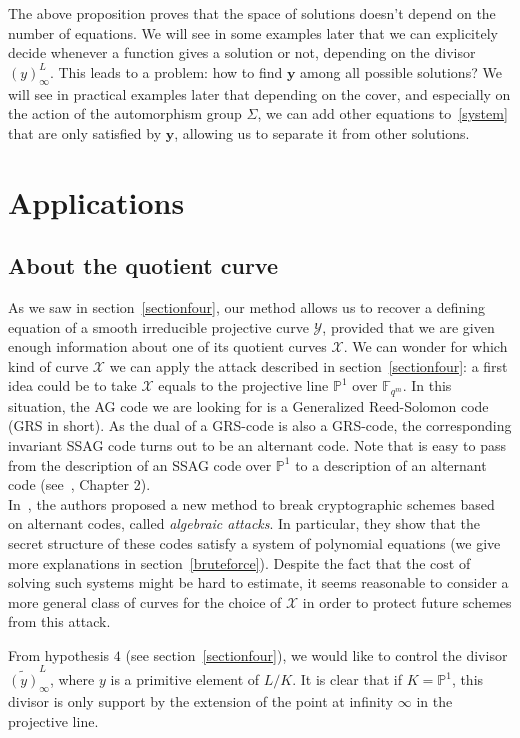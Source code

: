 \documentclass[10pt]{article}
\theoremstyle{definition}
\theoremstyle{definition}
\theoremstyle{definition}
\newcommand{\PP}{\mathbb{P}}
\newcommand{\fqm}{\mathbb{F}_{q^m}}
\newcommand{\X}{\mathcal{X}}
\newcommand{\Y}{\mathcal{Y}}
\begin{document}
The above proposition proves that the space of solutions doesn't depend on the number of equations. 
We will see in some examples later that we can explicitely decide whenever a function gives a solution or not, depending on the divisor $(y)^L_{\infty}$. This leads to a problem: how to find $\mathbf{y}$ among all possible solutions? We will see in practical examples later that depending on the cover, and especially on the action of the automorphism group $\Sigma$,  we can add other equations to~\eqref{system} that are only satisfied by $\mathbf{y}$, allowing us to separate it from other solutions.

\section{Applications}


\subsection{About the quotient curve}

As we saw in section~\ref{sectionfour}, our method allows us to recover a defining equation of a smooth irreducible projective curve $\Y$, provided that we are given enough information about one of its quotient curves $\X$. We can wonder for which kind of curve $\X$ we can apply the attack described in section~\ref{sectionfour}: a first idea could be to take $\X$ equals to the projective line $\PP^1$ over $\fqm$.
In this situation, the AG code we are looking for is a Generalized Reed-Solomon code (GRS in short). As the dual of a GRS-code is also a GRS-code, the corresponding invariant SSAG code turns out to be an alternant code. Note that is easy to pass from the description of an SSAG code over $\PP^1$ to a description of an alternant code (see~\cite{Sti}, Chapter 2). \\
In~\cite{FOP2}, the authors proposed a new method to break cryptographic schemes based on alternant codes, called \emph{algebraic attacks}. In particular, they show that the secret structure of these codes satisfy a system of polynomial equations (we give more explanations in section~\ref{bruteforce}). Despite the fact that the cost of solving such systems might be hard to estimate, it seems reasonable to consider a more general class of curves for the choice of $\X$ in order to protect future schemes from this attack.


From hypothesis $4$ (see section~\ref{sectionfour}), we would like to control the divisor $\widetilde{(y)}^L_{\infty}$, where $y$ is a primitive element of $L/K$. It is clear that if $K=\PP^1$, this divisor is only support by the extension of the point at infinity $\infty$ in the projective line. 
\end{document}
